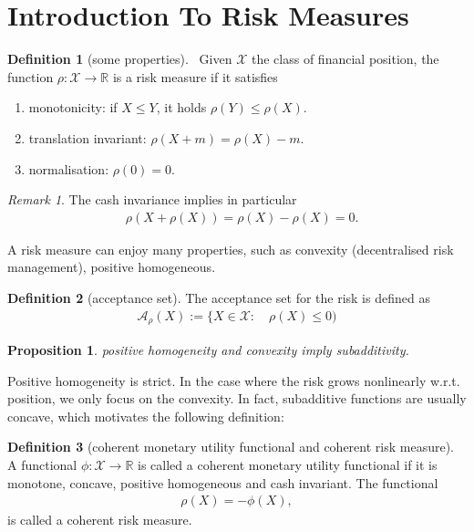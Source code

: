 \documentclass[a4paper,11pt]{book}
\newtheorem{proposition}[theorem]{Proposition}
\theoremstyle{definition}
\newtheorem{definition}{Definition}[section]
\theoremstyle{remark}
\newtheorem*{remark}{Remark}
\begin{document}
\section{Introduction To Risk Measures}
\begin{definition}[some properties]\
Given $\mathcal{X}$ the class of financial position, the function $\rho: \mathcal{X} \rightarrow \mathbb{R}$ is a risk measure if it satisfies
\begin{enumerate}
	\item monotonicity: if $X \le Y$, it holds $\rho(Y) \le \rho(X)$. 
	\item translation invariant: $\rho(X + m) = \rho(X) - m$. 
	\item normalisation: $\rho(0) = 0$. 
\end{enumerate}
\end{definition}
\begin{remark}
The cash invariance implies in particular
\begin{align*}
	& \rho(X + \rho(X)) = \rho(X) - \rho(X) = 0.
\end{align*}	
\end{remark}

A risk measure can enjoy many properties, such as convexity (decentralised risk management), positive homogeneous. 

\begin{definition}[acceptance set]
	The acceptance set for the risk  is defined as 
	\begin{align*}
		\mathcal{A}_\rho (X):= \{ X \in \mathcal{X}: \quad \rho(X) \le 0)
	\end{align*}
\end{definition}

\begin{proposition}
	positive homogeneity and convexity imply subadditivity. 
\end{proposition}
Positive homogeneity is strict. In the case where the risk grows nonlinearly w.r.t. position, we only focus on the convexity. In fact, subadditive functions are usually concave, which motivates the following definition:

\begin{definition}[coherent monetary utility functional and coherent risk measure]
A functional $\phi: \mathcal{X} \rightarrow \mathbb{R}$ is called a coherent monetary utility functional if it is monotone, concave, positive homogeneous and cash invariant. The functional 
\begin{align*}
	\rho(X) = - \phi(X),
\end{align*}
is called a coherent risk measure. 
\end{definition}
\end{document}
